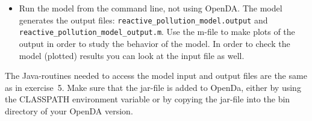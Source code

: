 \documentclass[a4paper,10pt]{article}
\begin{document}
\begin{itemize}
\item Run the model from the command line, not using OpenDA. The model
  generates the output files: {\tt reactive\_pollution\_model.output} and
  \\ {\tt reactive\_pollution\_model\_output.m}. Use the m-file to make plots
  of the output in order to study the behavior of the model. In order to check
  the model (plotted) results you can look at the input file as well.
\end{itemize}

The Java-routines needed to access the model input and output files are the
same as in exercise~5. Make sure that the jar-file is added to OpenDa, either
by using the CLASSPATH environment variable or by copying the jar-file into the
bin directory of your OpenDA version.

\end{document}
